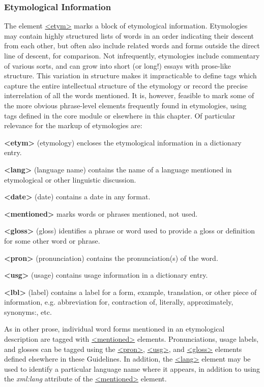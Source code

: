 \subsubsection[{Etymological Information}]{Etymological Information}\label{DITPET}\par
The element \hyperref[TEI.etym]{<etym>} marks a block of etymological information. Etymologies may contain highly structured lists of words in an order indicating their descent from each other, but often also include related words and forms outside the direct line of descent, for comparison. Not infrequently, etymologies include commentary of various sorts, and can grow into short (or long!) essays with prose-like structure. This variation in structure makes it impracticable to define tags which capture the entire intellectual structure of the etymology or record the precise interrelation of all the words mentioned. It is, however, feasible to mark some of the more obvious phrase-level elements frequently found in etymologies, using tags defined in the core module or elsewhere in this chapter. Of particular relevance for the markup of etymologies are:
\begin{sansreflist}
  
\item [\textbf{<etym>}] (etymology) encloses the etymological information in a dictionary entry.
\item [\textbf{<lang>}] (language name) contains the name of a language mentioned in etymological or other linguistic discussion.
\item [\textbf{<date>}] (date) contains a date in any format.
\item [\textbf{<mentioned>}] marks words or phrases mentioned, not used.
\item [\textbf{<gloss>}] (gloss) identifies a phrase or word used to provide a gloss or definition for some other word or phrase.
\item [\textbf{<pron>}] (pronunciation) contains the pronunciation(s) of the word.
\item [\textbf{<usg>}] (usage) contains usage information in a dictionary entry.
\item [\textbf{<lbl>}] (label) contains a label for a form, example, translation, or other piece of information, e.g. abbreviation for, contraction of, literally, approximately, synonyms:, etc.
\end{sansreflist}
\par
As in other prose, individual word forms mentioned in an etymological description are tagged with \hyperref[TEI.mentioned]{<mentioned>} elements. Pronunciations, usage labels, and glosses can be tagged using the \hyperref[TEI.pron]{<pron>}, \hyperref[TEI.usg]{<usg>}, and \hyperref[TEI.gloss]{<gloss>} elements defined elsewhere in these Guidelines. In addition, the \hyperref[TEI.lang]{<lang>} element may be used to identify a particular language name where it appears, in addition to using the {\itshape xml:lang} attribute of the \hyperref[TEI.mentioned]{<mentioned>} element.\par
